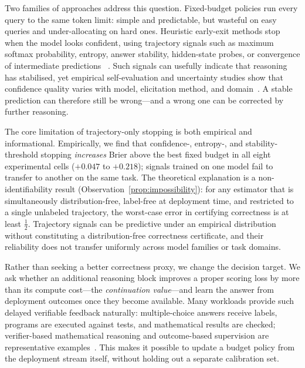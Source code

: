 \documentclass[a4paper,fleqn]{cas-sc}
\theoremstyle{plain}
\theoremstyle{definition}
\theoremstyle{remark}
\begin{document}
Two families of approaches address this question.
Fixed-budget policies run every query to the same token limit: simple and
predictable, but wasteful on easy queries and under-allocating on hard ones.
Heuristic early-exit methods stop when the model looks confident, using
trajectory signals such as maximum softmax probability, entropy, answer
stability, hidden-state probes, or convergence of intermediate predictions
~\cite{yang2026deer,wu2025thoughtcalibration,zhang2025selfverification,liu2025answerconvergence,sun2026refrain,xie2026statistical}.
Such signals can usefully indicate that reasoning has stabilised, yet empirical
self-evaluation and uncertainty studies show that confidence quality varies with
model, elicitation method, and domain~\cite{kadavath2022know,xiong2024uncertainty,kuhn2023semantic,zeng2025thinkingoutloud}. A stable prediction can therefore still be
wrong---and a wrong one can be corrected by further reasoning.

The core limitation of trajectory-only stopping is both empirical and
informational.
Empirically, we find that confidence-, entropy-, and stability-threshold
stopping \emph{increases} Brier above the best fixed budget in all eight
experimental cells ($+0.047$ to $+0.218$); signals trained on one model
fail to transfer to another on the same task.
The theoretical explanation is a non-identifiability result
(Observation~\ref{prop:impossibility}): for any estimator that is
simultaneously distribution-free, label-free at deployment time, and
restricted to a single unlabeled trajectory, the worst-case error in certifying
correctness is at least $\frac{1}{2}$.
Trajectory signals can be predictive under an empirical distribution without
constituting a distribution-free correctness certificate,
and their reliability does not transfer uniformly across model families
or task domains.

Rather than seeking a better correctness proxy, we change the decision target.
We ask whether an additional reasoning block improves a proper scoring loss
by more than its compute cost---the \emph{continuation value}---and learn the
answer from deployment outcomes once they become available.
Many workloads provide such delayed verifiable feedback naturally:
multiple-choice answers receive labels, programs are executed against tests,
and mathematical results are checked; verifier-based mathematical reasoning and
outcome-based supervision are representative examples~\cite{cobbe2021verifiers,uesato2022process}.
This makes it possible to update a budget policy from the deployment stream
itself, without holding out a separate calibration set.
\end{document}
